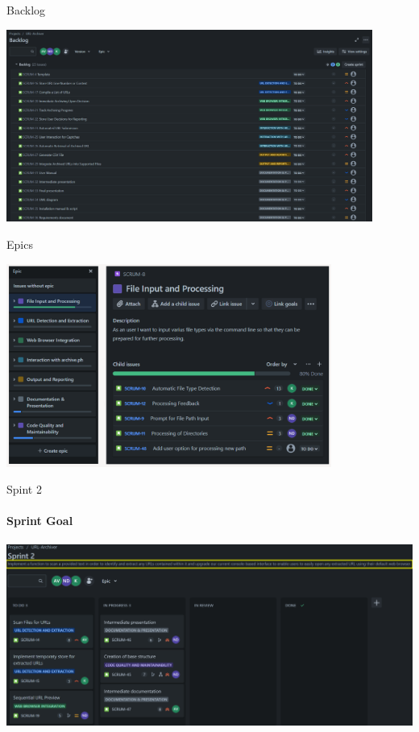 \documentclass[
    ngerman,%
    authorontitle=true,
]{bfhbeamer}
\begin{document}
    \begin{frame}{Backlog}
        \begin{center}
            \includegraphics[width=0.9\textwidth]{pictures/backlog}
        \end{center}
    \end{frame}

    \begin{frame}{Epics}
        \begin{center}
            \includegraphics[width=0.8\textwidth]{pictures/epics}
        \end{center}
    \end{frame}

    \begin{frame}{Spint 2}
        \framesubtitle{Sprint Goal}
        \includegraphics[width=1\textwidth]{pictures/sprint_2_goal}
    \end{frame}
\end{document}

